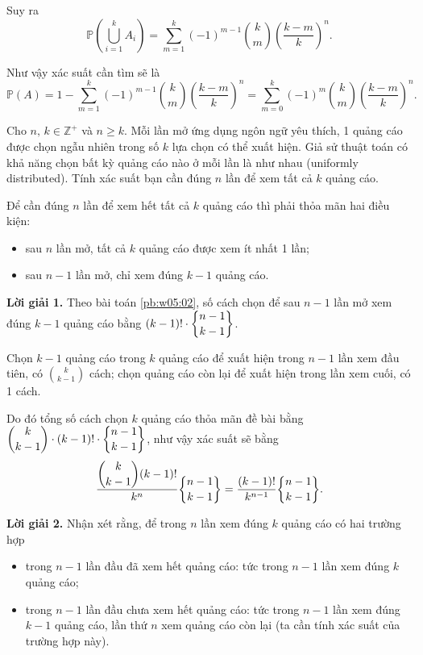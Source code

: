 Suy ra $$\mathbb{P}\left(\bigcup_{i=1}^k A_i\right) = \sum_{m=1}^k (-1)^{m-1}{k \choose m}\left(\dfrac{k-m}{k}\right)^n.$$

Như vậy xác suất cần tìm sẽ là $$\mathbb{P}(A) = 1 - \sum_{m=1}^k (-1)^{m-1}{k \choose m}\left(\dfrac{k-m}{k}\right)^n = \sum_{m=0}^k (-1)^{m}{k \choose m}\left(\dfrac{k-m}{k}\right)^n.$$

\begin{tcolorbox}[breakable]
    \begin{baitoan}\label{pb:w05:01}
        Cho $n,\,k\in \mathbb{Z^+}$ và $n \geq k$. Mỗi lần mở ứng dụng ngôn ngữ yêu thích, 1 quảng cáo được chọn ngẫu nhiên trong số $k$ lựa chọn có thể xuất hiện. Giả sử thuật toán có khả năng chọn bất kỳ quảng cáo nào ở mỗi lần là như nhau (uniformly distributed). Tính xác suất bạn cần đúng $n$ lần để xem tất cả $k$ quảng cáo.
    \end{baitoan}
\end{tcolorbox}

Để cần đúng $n$ lần để xem hết tất cả $k$ quảng cáo thì phải thỏa mãn hai điều kiện:
\begin{itemize}
    \item sau $n$ lần mở, tất cả $k$ quảng cáo được xem ít nhất 1 lần;
    \item sau $n-1$ lần mở, chỉ xem đúng $k-1$ quảng cáo.
\end{itemize}

\textbf{Lời giải 1. }Theo bài toán \ref{pb:w05:02}, số cách chọn để sau $n-1$ lần mở xem đúng $k-1$ quảng cáo bằng $\displaystyle (k-1)! \cdot \stirlingII{n-1}{k-1}$.

Chọn $k-1$ quảng cáo trong $k$ quảng cáo để xuất hiện trong $n-1$ lần xem đầu tiên, có $\displaystyle{k \choose k-1}$ cách; chọn quảng cáo còn lại để xuất hiện trong lần xem cuối, có 1 cách. 

Do đó tổng số cách chọn $k$ quảng cáo thỏa mãn đề bài bằng $\displaystyle {k \choose k-1} \cdot (k-1)! \cdot \stirlingII{n-1}{k-1}$, như vậy xác suất sẽ bằng $$\dfrac{\displaystyle{k \choose k-1}(k-1)!}{k^n}\stirlingII{n-1}{k-1} = \dfrac{(k-1)!}{k^{n-1}}\stirlingII{n-1}{k-1}.$$

\textbf{Lời giải 2. }Nhận xét rằng, để trong $n$ lần xem đúng $k$ quảng cáo có hai trường hợp
\begin{itemize}
    \item trong $n-1$ lần đầu đã xem hết quảng cáo: tức trong $n-1$ lần xem đúng $k$ quảng cáo;
    \item trong $n-1$ lần đầu chưa xem hết quảng cáo: tức trong $n-1$ lần xem đúng $k-1$ quảng cáo, lần thứ $n$ xem quảng cáo còn lại (ta cần tính xác suất của trường hợp này).
\end{itemize}

